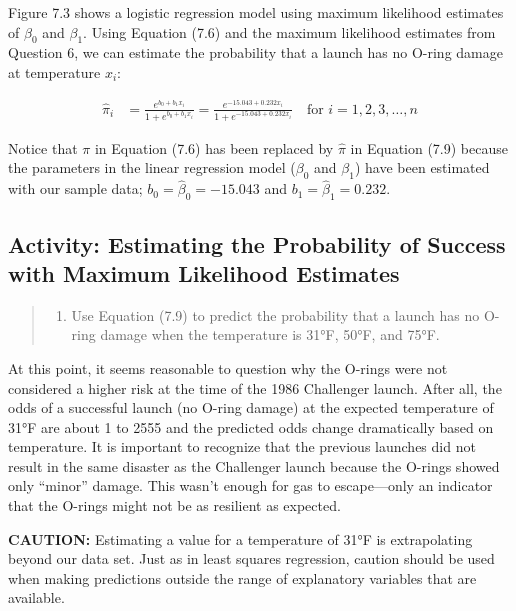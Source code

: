 \documentclass[
]{report}
\providecommand{\tightlist}{%
  \setlength{\itemsep}{0pt}\setlength{\parskip}{0pt}}
\begin{document}
Figure 7.3 shows a logistic regression model using maximum likelihood estimates of \(\beta_0\) and \(\beta_1\). Using Equation (7.6) and the maximum likelihood estimates from Question 6, we can estimate the probability that a launch has no O-ring damage at temperature \(x_i\):

\begin{align}
\hat\pi_i &= \frac{e^{b_0 + b_1 x_i}}{1 + e^{b_0 + b_1 x_i}} 
           = \frac{e^{-15.043 + 0.232 x_i}}{1 + e^{-15.043 + 0.232 x_i}}
           \quad \text{for } i = 1,2,3,\dots,n \tag{7.9}
\end{align}

Notice that \(\pi\) in Equation (7.6) has been replaced by \(\hat\pi\) in Equation (7.9) because the parameters in the linear regression model (\(\beta_0\) and \(\beta_1\)) have been estimated with our sample data; \(b_0 = \hat\beta_0 = -15.043\) and \(b_1 = \hat\beta_1 = 0.232\).

\subsection{Activity: Estimating the Probability of Success with Maximum Likelihood Estimates}\label{activity-estimating-the-probability-of-success-with-maximum-likelihood-estimates}

\begin{quote}
\begin{enumerate}
\def\labelenumi{\arabic{enumi}.}
\setcounter{enumi}{6}
\tightlist
\item
  Use Equation (7.9) to predict the probability that a launch has no O-ring damage when the temperature is 31°F, 50°F, and 75°F.
\end{enumerate}
\end{quote}

At this point, it seems reasonable to question why the O-rings were not considered a higher risk at the time of the 1986 Challenger launch. After all, the odds of a successful launch (no O-ring damage) at the expected temperature of 31°F are about 1 to 2555 and the predicted odds change dramatically based on temperature. It is important to recognize that the previous launches did not result in the same disaster as the Challenger launch because the O-rings showed only ``minor'' damage. This wasn't enough for gas to escape---only an indicator that the O-rings might not be as resilient as expected.

\large

\textbf{CAUTION:} Estimating a value for a temperature of 31°F is extrapolating beyond our data set. Just as in least squares regression, caution should be used when making predictions outside the range of explanatory variables that are available.
\normalsize
\end{document}
